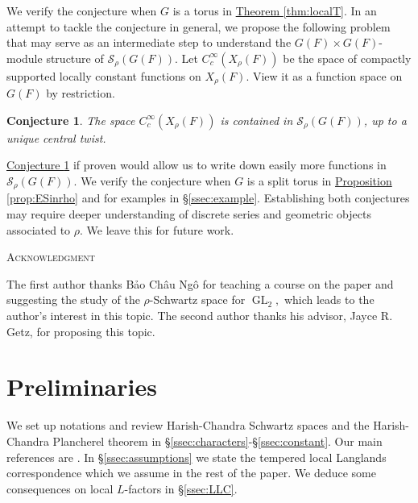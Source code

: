 \documentclass[10pt]{amsart}
\newtheorem{conjecture}[theorem]{Conjecture}
\theoremstyle{definition}
\numberwithin{equation}{section}
\DeclareMathOperator{\GL}{\mathrm{GL}}
\numberwithin{equation}{subsection}
\begin{document}
We verify the conjecture when $G$ is a torus in \hyperref[thm:localT]{Theorem \ref{thm:localT}}. In an attempt to tackle the conjecture in general, we propose the following problem that may serve as an intermediate step to understand the $G(F)\times G(F)$-module structure of $\mathcal{S}_\rho(G(F))$. Let $C^\infty_c(X_\rho(F))$ be the space of compactly supported locally constant functions on $X_\rho(F)$. View it as a function space on $G(F)$ by restriction.
\begin{conjecture}\label{conj:main:SES}
    The space $C^\infty_c(X_\rho(F))$ is contained in $\mathcal{S}_\rho(G(F))$, up to a unique central twist.
\end{conjecture}
\hyperref[conj:main:SES]{Conjecture \ref{conj:main:SES}} if proven would allow us to write down easily more functions in $\mathcal{S}_\rho(G(F)).$ We verify the conjecture when $G$ is a split torus in \hyperref[prop:ESinrho]{Proposition \ref{prop:ESinrho}} and for examples in \S\ref{ssec:example}.  Establishing both conjectures may require deeper understanding of discrete series and geometric objects associated to $\rho$. We leave this for future work.



\vspace{0.2cm}
\begin{center}
    \textsc{Acknowledgment}
\end{center}
The first author thanks Bảo Ch\^au Ng\^o for teaching a course on the paper \cite{Luo:Ngo} and suggesting the study of the $\rho$-Schwartz space for $\GL_2,$ which leads to the author's interest in this topic.  
The second author thanks his advisor, Jayce R. Getz, for proposing this topic.






\section{Preliminaries}\label{sec:prelim}

We set up notations and review Harish-Chandra Schwartz spaces and the Harish-Chandra Plancherel theorem in \S \ref{ssec:characters}-\S \ref{ssec:constant}. Our main references are \cite{Waldspurger:Plancherel, Representation-p-adic}. In \S\ref{ssec:assumptions} we state the tempered local Langlands correspondence which we assume in the rest of the paper. We deduce some consequences on local $L$-factors in \S\ref{ssec:LLC}. 
\end{document}
